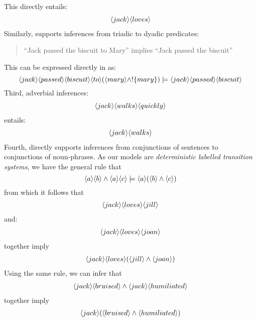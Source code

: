 This directly entails:
\begin{eqnarray*}
\langle jack \rangle \langle loves \rangle \end{eqnarray*}
Similarly, \ELABR{} supports inferences from triadic to dyadic predicates:
\begin{quote}
``Jack passed the biscuit to Mary'' implies ``Jack passed the biscuit''
\end{quote}
This can be expressed directly in \ELABR{} as:
\[
\langle jack \rangle \langle passed \rangle \langle biscuit \rangle \langle to \rangle (\langle mary \rangle \land !\{mary\}) \models \langle jack \rangle \langle passed \rangle \langle biscuit \rangle \]
Third, adverbial inferences: 
\begin{eqnarray*}
\langle jack \rangle \langle walks \rangle \langle quickly \rangle \end{eqnarray*}
entails:
\begin{eqnarray*}
\langle jack \rangle \langle walks \rangle \end{eqnarray*}
Fourth, \ELABR{} directly supports inferences from conjunctions of sentences to conjunctions of noun-phrases.
As our models are \emph{deterministic labelled transition systems}, we have the general rule that
\[
\langle a \rangle \langle b \rangle \land \langle a \rangle \langle c \rangle \models \langle a \rangle (\langle b \rangle \land \langle c \rangle )
\]
from which it follows that 
\begin{eqnarray*}
\langle jack \rangle \langle loves \rangle \langle jill \rangle \end{eqnarray*}
and:
\begin{eqnarray*}
\langle jack \rangle \langle loves \rangle \langle joan \rangle \end{eqnarray*}
together imply
\begin{eqnarray*}
\langle jack \rangle \langle loves \rangle (\langle jill \rangle \land \langle joan \rangle )
\end{eqnarray*}
Using the same rule, we can infer that
\begin{eqnarray*}
\langle jack \rangle \langle bruised \rangle \land \langle jack \rangle \langle humiliated \rangle \end{eqnarray*}
together imply
\begin{eqnarray*}
\langle jack \rangle (\langle bruised \rangle \land \langle humiliated \rangle )
\end{eqnarray*}
 
